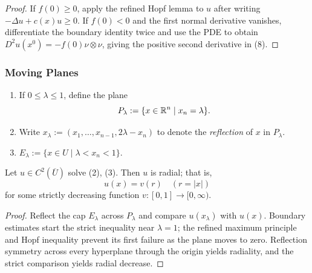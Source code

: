 \begin{proof}
\sketch If $f(0)\geq0$, apply the refined Hopf lemma to $u$ after writing $-\Delta u+c(x)u\geq0$. If $f(0)<0$ and the first normal derivative vanishes, differentiate the boundary identity twice and use the PDE to obtain $D^2u(x^0)=-f(0)\nu\otimes\nu$, giving the positive second derivative in (8).
\end{proof}

\subsubsection{Moving Planes}
\label{sec:moving-planes}

\begin{definition}
\label{def:moving-plane-notation}
\begin{enumerate}
\item[(i)] If $0 \le \lambda \le 1$, define the plane
\[
P_\lambda := \{x \in \mathbb{R}^n \mid x_n = \lambda\}.
\]
\item[(ii)] Write $x_\lambda := (x_1, \ldots, x_{n-1}, 2\lambda - x_n)$ to denote the \textit{reflection} of $x$ in $P_\lambda$.
\item[(iii)] $E_\lambda := \{x \in U \mid \lambda < x_n < 1\}$.
\end{enumerate}
\end{definition}

\begin{theorem}
\label{thm:radial-symmetry-positive-solutions}

Let $u \in C^2(\overline{U})$ solve (2), (3). Then $u$ is radial; that is,
\[
u(x) = v(r) \quad (r = |x|)
\]
for some strictly decreasing function $v : [0, 1] \to [0, \infty)$.
\end{theorem}

\begin{proof}
\sketch Reflect the cap $E_\lambda$ across $P_\lambda$ and compare $u(x_\lambda)$ with $u(x)$. Boundary estimates start the strict inequality near $\lambda=1$; the refined maximum principle and Hopf inequality prevent its first failure as the plane moves to zero. Reflection symmetry across every hyperplane through the origin yields radiality, and the strict comparison yields radial decrease.
\end{proof}


